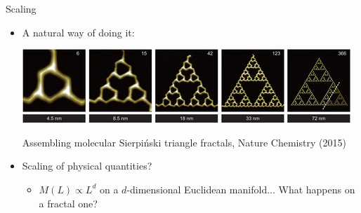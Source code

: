 \documentclass[xcolor=x11names,compress,professionalfonts]{beamer}
\renewcommand{\(}{\begin{columns}}
\renewcommand{\)}{\end{columns}}
\newcommand{\<}[1]{\begin{column}{#1}}
\renewcommand{\>}{\end{column}}
\begin{document}
\begin{frame}{Scaling}
\begin{itemize}
	\item A natural way of doing it:
	
	{\centering 
	\includegraphics[scale=0.4]{sierpinsky_nature.jpg}
	\scriptsize
	
	Assembling molecular Sierpiński triangle fractals, Nature Chemistry (2015)
	
	}
	
	\item Scaling of physical quantities? 
	\begin{itemize}
		\item $M(L) \propto L^d$ on a $d$-dimensional Euclidean manifold... What happens on a fractal one?
	\end{itemize}
\end{itemize}
	
\end{frame}
\end{document}
